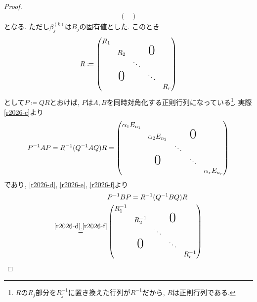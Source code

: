 \documentclass[titlepage]{jsarticle}
\numberwithin{equation}{section}
\begin{document}
\begin{proof}
\begin{align}
\begin{pmatrix}
\end{pmatrix} \label{r2026-e}
\end{align}
となる. ただし$\beta_j^{(k)}$は$B_j$の固有値とした. このとき
\begin{align}
R \coloneq
\begin{pmatrix}
R_ 1                                                           \\
         & R_2           &        & \text{\huge{0}}   \\
         &                      & \ddots                       \\
         & \text{\huge{0}} &        & \ddots             \\
         &                      &        &           & R_r
\end{pmatrix} \label{r2026-f}
\end{align}
として$P \coloneq QR$とおけば, $P$は$A, B$を同時対角化する正則行列になっている\footnote{$R$の$R_j$部分を$R_j^{-1}$に置き換えた行列が$R^{-1}$だから, $R$は正則行列である.}. 実際\eqref{r2026-c}より
\begin{align*}
P^{-1}AP = R^{-1}(Q^{-1}AQ)R =
\begin{pmatrix}
\alpha_1E_{n_1}                                                           \\
         & \alpha_2E_{n_2}           &        & \text{\huge{0}}   \\
         &                      & \ddots                       \\
         & \text{\huge{0}} &        & \ddots             \\
         &                      &        &           & \alpha_rE_{n_r}
\end{pmatrix}
\end{align*}
であり, \eqref{r2026-d}, \eqref{r2026-e}, \eqref{r2026-f}より
\begin{align*}
&P^{-1}BP = R^{-1}(Q^{-1}BQ)R \\ \stackrel{\eqref{r2026-d}, \eqref{r2026-f}}{=}
&
\begin{pmatrix}
R_ 1^{-1}                                                           \\
         & R_2 ^{-1}          &        & \text{\huge{0}}   \\
         &                      & \ddots                       \\
         & \text{\huge{0}} &        & \ddots             \\
         &                      &        &           & R_r^{-1}

\end{pmatrix}
\end{align*}
\end{proof}
\end{document}
